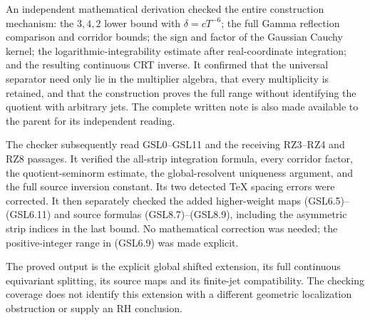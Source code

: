 An independent mathematical derivation checked the entire construction
mechanism: the \(3,4,2\) lower bound with \(\delta=cT^{-6}\); the full
Gamma reflection comparison and corridor bounds; the sign and factor of
the Gaussian Cauchy kernel; the logarithmic-integrability estimate after
real-coordinate integration; and the resulting continuous CRT inverse.
It confirmed that the universal separator need only lie in the
multiplier algebra, that every multiplicity is retained, and that the
construction proves the full range without identifying the quotient with
arbitrary jets. The complete written note is also made available to the
parent for its independent reading.

The checker subsequently read GSL0--GSL11 and the receiving RZ3--RZ4 and
RZ8 passages. It verified the all-strip integration formula, every
corridor factor, the quotient-seminorm estimate, the global-resolvent
uniqueness argument, and the full source inversion constant. Its two
detected TeX spacing errors were corrected. It then separately checked
the added higher-weight maps (GSL6.5)--(GSL6.11) and source formulas
(GSL8.7)--(GSL8.9), including the asymmetric strip indices in the last
bound. No mathematical correction was needed; the positive-integer range
in (GSL6.9) was made explicit.

The proved output is the explicit global shifted extension, its full
continuous equivariant splitting, its source maps and its finite-jet
compatibility. The checking coverage does not identify this extension
with a different geometric localization obstruction or supply an RH
conclusion.
